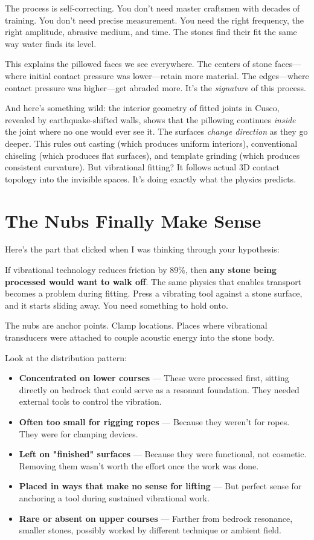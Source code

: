\documentclass[11pt]{article}
\begin{document}
The process is self-correcting. You don't need master craftsmen with decades of training. You don't need precise measurement. You need the right frequency, the right amplitude, abrasive medium, and time. The stones find their fit the same way water finds its level.

This explains the pillowed faces we see everywhere. The centers of stone faces—where initial contact pressure was lower—retain more material. The edges—where contact pressure was higher—get abraded more. It's the \textit{signature} of this process.

And here's something wild: the interior geometry of fitted joints in Cusco, revealed by earthquake-shifted walls, shows that the pillowing continues \textit{inside} the joint where no one would ever see it. The surfaces \textit{change direction} as they go deeper. This rules out casting (which produces uniform interiors), conventional chiseling (which produces flat surfaces), and template grinding (which produces consistent curvature). But vibrational fitting? It follows actual 3D contact topology into the invisible spaces. It's doing exactly what the physics predicts.

\section*{The Nubs Finally Make Sense}

Here's the part that clicked when I was thinking through your hypothesis:

If vibrational technology reduces friction by 89\%, then \textbf{any stone being processed would want to walk off}. The same physics that enables transport becomes a problem during fitting. Press a vibrating tool against a stone surface, and it starts sliding away. You need something to hold onto.

The nubs are anchor points. Clamp locations. Places where vibrational transducers were attached to couple acoustic energy into the stone body.

Look at the distribution pattern:
\begin{itemize}
    \item \textbf{Concentrated on lower courses} — These were processed first, sitting directly on bedrock that could serve as a resonant foundation. They needed external tools to control the vibration.
    \item \textbf{Often too small for rigging ropes} — Because they weren't for ropes. They were for clamping devices.
    \item \textbf{Left on "finished" surfaces} — Because they were functional, not cosmetic. Removing them wasn't worth the effort once the work was done.
    \item \textbf{Placed in ways that make no sense for lifting} — But perfect sense for anchoring a tool during sustained vibrational work.
    \item \textbf{Rare or absent on upper courses} — Farther from bedrock resonance, smaller stones, possibly worked by different technique or ambient field.
\end{itemize}
\end{document}
